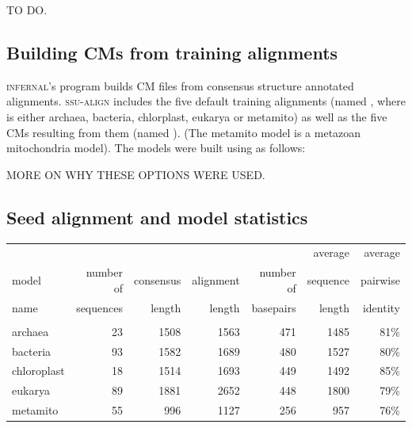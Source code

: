 TO DO.

\subsection{Building CMs from training alignments}

\textsc{infernal}'s  program builds CM files from
consensus structure annotated alignments. \textsc{ssu-align} includes
the five default training alignments (named , where
 is either archaea, bacteria, chlorplast, eukarya or
metamito) as well as the five CMs resulting from them (named
). (The metamito model is a metazoan mitochondria
model). The models were built using  as
follows: 

MORE ON WHY THESE OPTIONS WERE USED.

\subsection{Seed alignment and model statistics} 

\begin{center}
\begin{tabular}{lrrrrrr}
        &           &           &           &           & average   & average  \\
model   & number of & consensus & alignment & number of & sequence  & pairwise \\
name    & sequences & length    & length    & basepairs & length    & identity \\ \hline
        &           &           &           &                       &          \\
archaea & 23        & 1508      & 1563      & 471       & 1485      & 81\%     \\
bacteria& 93        & 1582      & 1689      & 480       & 1527      & 80\%     \\
chloroplast& 18     & 1514      & 1693      & 449       & 1492      & 85\%     \\
eukarya  & 89       & 1881      & 2652      & 448       & 1800      & 79\%     \\ 
metamito & 55       &  996      & 1127      & 256       & 957       & 76\%     \\
\end{tabular}
\end{center}

